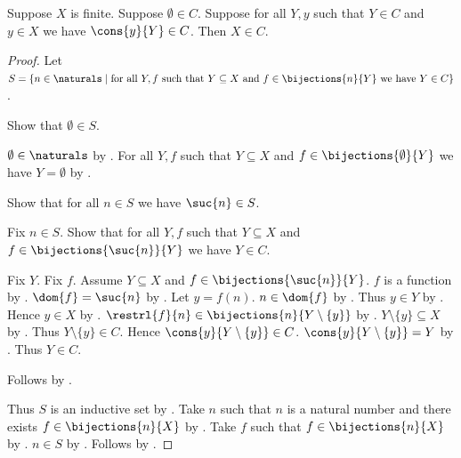 \begin{theorem}\label{finite_induction}
    Suppose $X$ is finite.
    Suppose $\emptyset\in C$.
    Suppose for all $Y,y$ such that $Y\in C$ and $y\in X$ we have
        $\cons{y}{Y}\in C$.
    Then $X\in C$.
\end{theorem}
\begin{proof}
    Let $S=\{n\in\naturals\mid
        \text{for all $Y,f$ such that $Y\subseteq X$ and
            $f\in\bijections{n}{Y}$ we have $Y\in C$}\}$.

    Show that $\emptyset\in S$.
    \begin{subproof}
        $\emptyset\in\naturals$ by .
        For all $Y,f$ such that $Y\subseteq X$ and
            $f\in\bijections{\emptyset}{Y}$ we have $Y=\emptyset$
            by .
    \end{subproof}

    Show that for all $n\in S$ we have $\suc{n}\in S$.
    \begin{subproof}
        Fix $n\in S$.
        Show that for all $Y,f$ such that $Y\subseteq X$ and
            $f\in\bijections{\suc{n}}{Y}$ we have $Y\in C$.
        \begin{subproof}
            Fix $Y$.
            Fix $f$.
            Assume $Y\subseteq X$ and $f\in\bijections{\suc{n}}{Y}$.
            $f$ is a function by .
            $\dom{f}=\suc{n}$ by .
            Let $y=f(n)$.
            $n\in\dom{f}$ by .
            Thus $y\in Y$ by .
            Hence $y\in X$ by .
            $\restrl{f}{n}\in\bijections{n}{Y\setminus\{y\}}$
                by .
            $Y\setminus\{y\}\subseteq X$
                by .
            Thus $Y\setminus\{y\}\in C$.
            Hence $\cons{y}{Y\setminus\{y\}}\in C$.
            $\cons{y}{Y\setminus\{y\}}=Y$ by .
            Thus $Y\in C$.
        \end{subproof}
        Follows by .
    \end{subproof}

    Thus $S$ is an inductive set by .
    Take $n$ such that $n$ is a natural number and
        there exists $f\in\bijections{n}{X}$ by .
    Take $f$ such that $f\in\bijections{n}{X}$ by \auto.
    $n\in S$ by .
    Follows by .
\end{proof}

